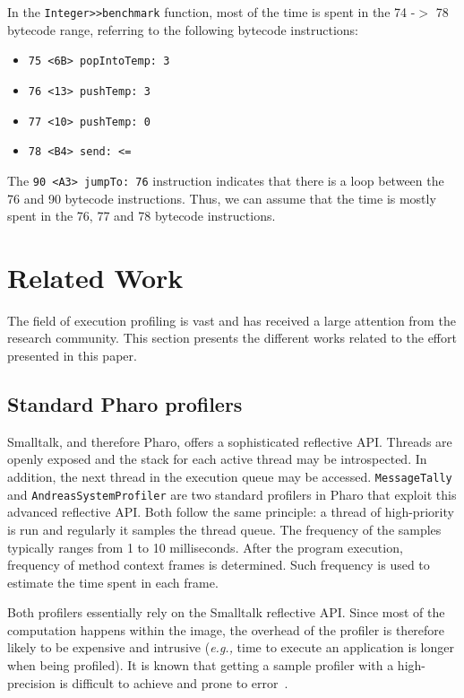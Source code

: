 \documentclass[10pt,preprint,nonatbib]{sigplanconf}
\newcommand{\ct}{\lstinline[backgroundcolor=\color{white},basicstyle=\small\ttfamily]}
\newcommand{\eg}{\emph{e.g.,}\xspace}
\newcommand{\seclabel}[1]{\label{sec:#1}}
\begin{document}
In the \ct{Integer>>benchmark} function, most of the time is spent in the 74 -$>$ 78 bytecode range, referring to the following bytecode instructions: 
\begin{itemize}
	\item \ct{75 <6B> popIntoTemp: 3}
	\item \ct{76 <13> pushTemp: 3}
	\item \ct{77 <10> pushTemp: 0}
	\item \ct{78 <B4> send: <=}
\end{itemize}
The \ct{90 <A3> jumpTo: 76} instruction indicates that there is a loop between the 76 and 90 bytecode instructions. Thus, we can assume that the time is mostly spent in the 76, 77 and 78 bytecode instructions.

\section{Related Work}\seclabel{relatedWork}

The field of execution profiling is vast and has received a large attention from the research community. This section presents the different works related to the effort presented in this paper.

\subsection{Standard Pharo profilers}

Smalltalk, and therefore Pharo, offers a sophisticated reflective API. Threads are openly exposed and the stack for each active thread may be introspected. In addition, the next thread in the execution queue may be accessed. \ct{MessageTally} and \ct{AndreasSystemProfiler} are two standard profilers in Pharo that exploit this advanced reflective API. Both follow the same principle: a thread of high-priority is run and regularly it samples the thread queue. The frequency of the samples typically ranges from 1 to 10 milliseconds. After the program execution, frequency of method context frames is determined. Such frequency is used to estimate the time spent in each frame. 

Both profilers essentially rely on the Smalltalk reflective API. Since most of the computation happens within the image, the overhead of the profiler is therefore likely to be expensive and intrusive (\eg time to execute an application is longer when being profiled). It is known that getting a sample profiler with a high-precision is difficult to achieve and prone to error~\cite{Mytk08a,Mytk10a,Berg11d}. 
\end{document}
